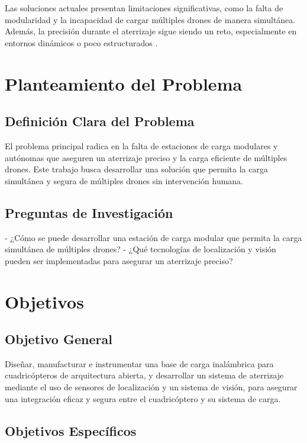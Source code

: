 Las soluciones actuales presentan limitaciones significativas, como la falta de modularidad y la incapacidad de cargar múltiples drones de manera simultánea. Además, la precisión durante el aterrizaje sigue siendo un reto, especialmente en entornos dinámicos o poco estructurados \cite{Mourgelas2020}.

\section{Planteamiento del Problema}

\subsection{Definición Clara del Problema}

El problema principal radica en la falta de estaciones de carga modulares y autónomas que aseguren un aterrizaje preciso y la carga eficiente de múltiples drones. Este trabajo busca desarrollar una solución que permita la carga simultánea y segura de múltiples drones sin intervención humana.

\subsection{Preguntas de Investigación}

- ¿Cómo se puede desarrollar una estación de carga modular que permita la carga simultánea de múltiples drones?
- ¿Qué tecnologías de localización y visión pueden ser implementadas para asegurar un aterrizaje preciso?

\section{Objetivos}

\subsection{Objetivo General}

Diseñar, manufacturar e instrumentar una base de carga inalámbrica para cuadricópteros de arquitectura abierta, y desarrollar un sistema de aterrizaje mediante el uso de sensores de localización y un sistema de visión, para asegurar una integración eficaz y segura entre el cuadricóptero y su sistema de carga.

\subsection{Objetivos Específicos}

